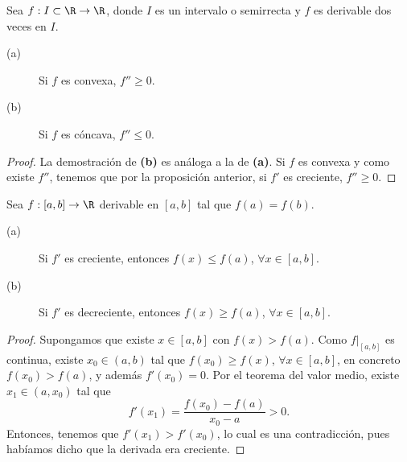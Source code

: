 \begin{fcolorary}[]
\normalfont Sea $\displaystyle f : I \subset \R \to \R $, donde $\displaystyle I $ es un intervalo o semirrecta y $\displaystyle f $ es derivable dos veces en $\displaystyle I $.
\begin{description}
\item[(a)] Si $\displaystyle f $ es convexa, $\displaystyle f'' \geq 0 $.
\item[(b)] Si $\displaystyle f $ es cóncava, $\displaystyle f'' \leq 0 $.
\end{description}
\end{fcolorary}
\begin{proof}
La demostración de \textbf{(b)} es análoga a la de \textbf{(a)}. Si $\displaystyle f $ es convexa y como existe $\displaystyle f'' $, tenemos que por la proposición anterior, si $\displaystyle f' $ es creciente, $\displaystyle f'' \geq 0$.
\end{proof}
\begin{flema}[]
	\normalfont Sea $\displaystyle f : [a,b] \to \R $ derivable en $\displaystyle \left[a,b\right] $ tal que $\displaystyle f\left(a\right) = f\left(b\right) $.
	\begin{description}
		\item[(a)] Si $\displaystyle f' $ es creciente, entonces $\displaystyle f\left(x\right) \leq f\left(a\right) $, $\displaystyle \forall x \in [a,b] $.
		\item[(b)] Si $\displaystyle f' $ es decreciente, entonces $\displaystyle f\left(x\right)\geq f\left(a\right) $, $\displaystyle \forall x \in [a,b] $.
	\end{description}
\end{flema}
\begin{proof}
	Supongamos que existe $\displaystyle x \in [a,b] $ con $\displaystyle f\left(x\right) > f\left(a\right) $. Como $\displaystyle f|_{[a,b]} $ es continua, existe $\displaystyle x_{0} \in \left(a,b\right) $ tal que $\displaystyle f\left(x_{0}\right) \geq f\left(x\right) $, $\displaystyle \forall x \in [a,b] $, en concreto $\displaystyle f\left(x_{0}\right) > f\left(a\right) $, y además $\displaystyle f'\left(x_{0}\right) =0 $.
	Por el teorema del valor medio, existe $\displaystyle x_{1} \in \left(a,x_{0}\right) $ tal que 
	\[f'\left(x_{1}\right) = \frac{f\left(x_{0}\right)-f\left(a\right)}{x_{0}-a} > 0 .\]
	Entonces, tenemos que $\displaystyle f'\left(x_{1}\right) > f'\left(x_{0}\right) $, lo cual es una contradicción, pues habíamos dicho que la derivada era creciente.
\end{proof}
